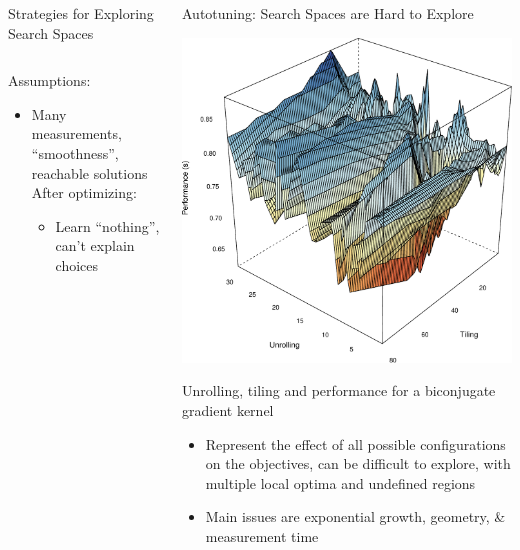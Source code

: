 \documentclass[11pt, compress, aspectratio=169, xcolor={table,usenames,dvipsnames}]{beamer}
\begin{document}
\begin{frame}
\begin{columns}
\begin{column}{0.89\columnwidth}
\begin{columns}
\begin{column}[t]{0.48\columnwidth}
\begin{block}{Strategies for Exploring Search Spaces}
\begin{columns}
\begin{column}{0.39\columnwidth}
Assumptions:
\vspace{0.3em}
\begin{itemize}
\item \alert{Many measurements}, \alert{``smoothness''}, \alert{reachable solutions}
\vspace{0.3em}
After optimizing:
\vspace{0.3em}
\begin{itemize}
\item \alert{Learn ``nothing''}, \alert{can't explain choices}
\end{itemize}
\end{itemize}
\end{column}
\end{columns}
\end{block}
\end{column}
\begin{column}[t]{0.48\columnwidth}
\begin{block}{Autotuning: Search Spaces are Hard to Explore}
\begin{center}
\includegraphics[width=.6\columnwidth]{../../../img/bicgkernel_averaged_search_space_edited.pdf}
\end{center}

\begin{center}
{\footnotesize
\alert{Unrolling}, \alert{tiling} and \alert{performance} for a \alert{biconjugate gradient} kernel
}
\vspace{1.3em}
\end{center}

\begin{itemize}
\item Represent the \alert{effect} of all possible
\alert{configurations} on the \alert{objectives}, can be difficult to explore,
with multiple \alert{local optima} and \alert{undefined regions}
\item \alert{Main issues} are \alert{exponential growth}, \alert{geometry}, \& \alert{measurement time}
\end{itemize}
\end{block}
\end{column}
\end{columns}


\end{column}
\end{columns}
\end{frame}
\end{document}
